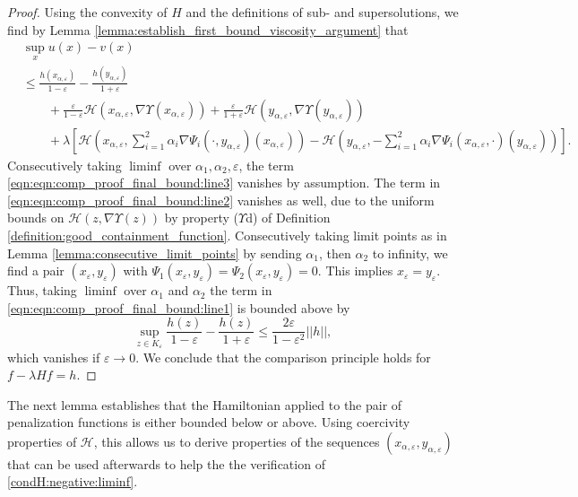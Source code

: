 \documentclass[a4paper]{article}
\newcommand{\cH}{\mathcal{H}}
\newcommand{\vn}[1]{\left| \! \left| #1\right| \! \right|}
\numberwithin{equation}{section}
\theoremstyle{definition}
\begin{document}
\begin{proof} %
	Using the convexity of $H$ and the definitions of sub- and supersolutions, we find by Lemma \ref{lemma:establish_first_bound_viscosity_argument} that
	\begin{align} 
		& \sup_x u(x) - v(x) \nonumber\\
		& \leq \frac{h(x_{\alpha,\varepsilon})}{1 - \varepsilon} - \frac{h(y_{\alpha,\varepsilon})}{1+\varepsilon}  \label{eqn:eqn:comp_proof_final_bound:line1}\\
		& \qquad + \frac{\varepsilon}{1-\varepsilon}\cH(x_{\alpha,\varepsilon}, \nabla \Upsilon(x_{\alpha,\varepsilon})) + \frac{\varepsilon}{1+\varepsilon}\cH(y_{\alpha,\varepsilon}, \nabla\Upsilon(y_{\alpha,\varepsilon})) \label{eqn:eqn:comp_proof_final_bound:line2}\\
		& \qquad +  \lambda \left[\cH\left(x_{\alpha,\varepsilon}, \sum_{i=1}^2 \alpha_i\nabla\Psi_i(\cdot,y_{\alpha,\varepsilon})(x_{\alpha,\varepsilon})\right) - \cH\left(y_{\alpha,\varepsilon},- \sum_{i=1}^2 \alpha_i\nabla\Psi_i(x_{\alpha,\varepsilon},\cdot)(y_{\alpha,\varepsilon})\right)\right].  \label{eqn:eqn:comp_proof_final_bound:line3}
	\end{align}
	Consecutively taking $\liminf$ over $\alpha_1,\alpha_2,\varepsilon$, the term \eqref{eqn:eqn:comp_proof_final_bound:line3} vanishes by assumption. The term in \eqref{eqn:eqn:comp_proof_final_bound:line2} vanishes as well, due to the uniform bounds on $\cH(z,\nabla \Upsilon(z))$ by property ($\Upsilon$d) of Definition \ref{definition:good_containment_function}. Consecutively taking limit points as in Lemma \ref{lemma:consecutive_limit_points} by sending $\alpha_1$, then $\alpha_2$ to infinity, we find a pair $(x_\varepsilon,y_\varepsilon)$ with $\Psi_1(x_\varepsilon,y_\varepsilon) = \Psi_2(x_\varepsilon,y_\varepsilon) = 0$. This implies $x_\varepsilon = y_\varepsilon$. Thus, taking $\liminf$ over $\alpha_1$ and $\alpha_2$ the term in \eqref{eqn:eqn:comp_proof_final_bound:line1} is bounded above by 
	\begin{equation*}
		\sup_{z \in K_\varepsilon} \frac{h(z)}{1-\varepsilon} - \frac{h(z)}{1+\varepsilon} \leq \frac{2 \varepsilon}{1 - \varepsilon^2} \vn{h},
	\end{equation*}
	which vanishes if $\varepsilon \rightarrow 0$. We conclude that the comparison principle holds for $f - \lambda H f = h$.
\end{proof}

The next lemma establishes that the Hamiltonian applied to the pair of penalization functions is either bounded below or above. Using coercivity properties of $\cH$, this allows us to derive properties of the sequences $(x_{\alpha,\varepsilon},y_{\alpha,\varepsilon})$ that can be used afterwards to help the the  verification of \eqref{condH:negative:liminf}.
\end{document}
